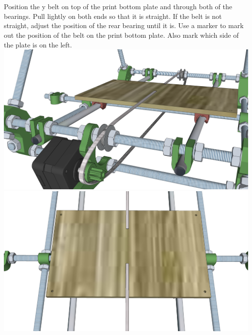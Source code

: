 \documentclass[twoside,a4paper,titlepage]{memoir}
\begin{document}
	\section{}
	Position the y belt on top of the print bottom plate and through both of the bearings. Pull lightly on both
	ends so that it is straight. If the belt is not straight, adjust the position of the rear bearing until it is. 		Use a marker to mark out the position of the belt on the print bottom plate. Also mark which side of the plate 		is on the left.\\
	\includegraphics[width=1\linewidth]{graphics/ch6_20_1.png}
	\includegraphics[width=1\linewidth]{graphics/ch6_20_2.png}
	
\end{document}

